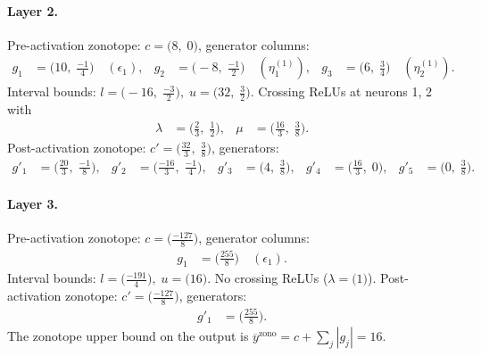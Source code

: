 \documentclass[11pt]{article}
\begin{document}
\paragraph{Layer 2.}
Pre-activation zonotope: $c = \bigl(8,\; 0\bigr)$, generator columns:
\begin{align*}
g_{1} &= \bigl(10,\; \frac{-1}{4}\bigr) \quad (\epsilon_{1}), &
g_{2} &= \bigl(-8,\; \frac{-1}{2}\bigr) \quad (\eta^{(1)}_{1}), &
g_{3} &= \bigl(6,\; \frac{3}{4}\bigr) \quad (\eta^{(1)}_{2}).
\end{align*}
Interval bounds: $l = \bigl(-16,\; \frac{-3}{2}\bigr), \; u = \bigl(32,\; \frac{3}{2}\bigr)$. 
Crossing ReLUs at neurons 1, 2 with
\begin{align*}
\lambda &= \bigl(\frac{2}{3},\; \frac{1}{2}\bigr), & \mu &= \bigl(\frac{16}{3},\; \frac{3}{8}\bigr).
\end{align*}
Post-activation zonotope: $c' = \bigl(\frac{32}{3},\; \frac{3}{8}\bigr)$, generators:
\begin{align*}
g'_{1} &= \bigl(\frac{20}{3},\; \frac{-1}{8}\bigr), &
g'_{2} &= \bigl(\frac{-16}{3},\; \frac{-1}{4}\bigr), &
g'_{3} &= \bigl(4,\; \frac{3}{8}\bigr), &
g'_{4} &= \bigl(\frac{16}{3},\; 0\bigr), &
g'_{5} &= \bigl(0,\; \frac{3}{8}\bigr).
\end{align*}
\paragraph{Layer 3.}
Pre-activation zonotope: $c = \bigl(\frac{-127}{8}\bigr)$, generator columns:
\begin{align*}
g_{1} &= \bigl(\frac{255}{8}\bigr) \quad (\epsilon_{1}).
\end{align*}
Interval bounds: $l = \bigl(\frac{-191}{4}\bigr), \; u = \bigl(16\bigr)$. 
No crossing ReLUs ($\lambda = \bigl(1\bigr)$).
Post-activation zonotope: $c' = \bigl(\frac{-127}{8}\bigr)$, generators:
\begin{align*}
g'_{1} &= \bigl(\frac{255}{8}\bigr).
\end{align*}
The zonotope upper bound on the output is $\overline{y}^{\text{zono}} = c + \sum_j |g_j| = 16$.
\end{document}
